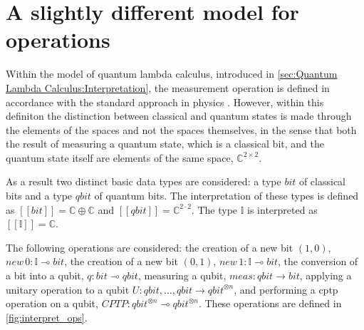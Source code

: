 \section{A slightly different model for operations}


Within the model of quantum lambda calculus, introduced in \autoref{sec:Quantum Lambda Calculus:Interpretation}, the measurement operation is defined in accordance with the standard approach in physics \cite{watrous2018theory}. However, within this definiton the distinction between classical and quantum states is made through the elements of the spaces and not the spaces themselves, in the sense that both the result of measuring a quantum state, which is a classical bit, and the quantum state itself are elements of the same space, $\mathbb{C}^{2 \times 2}$. 

As a result two distinct basic data types are considered: a type $\textit{bit}$ of classical bits and a type $\textit{qbit}$ of quantum bits.  The interpretation of these types is defined as  $[\![\textit{bit}]\!]=\mathbb{C}\oplus\mathbb{C}$ and $[\![\textit{qbit}]\!]=\mathbb{C}^{2\cdot 2}$. The type $\mathbb{I}$ is interpreted as $[\![\mathbb{I}]\!]=\mathbb{C}$.


The following operations are considered: the creation of a new bit $(1,0)$, $\textit{new} \hspace{2pt} 0  :\mathbb{I}  \multimap \textit{bit} $, the creation of a new bit $(0,1)$, $\textit{new} \hspace{2pt} 1  :\mathbb{I}  \multimap \textit{bit} $, the conversion of a bit into a qubit, $q : \textit{bit}  \multimap \textit{qbit}$, measuring a qubit, $\textit{meas}:\textit{qbit} \xrightarrow{} \textit{bit}$, applying a unitary operation to a qubit $\textit{U}:\textit{qbit},\ldots,\textit{qbit} \xrightarrow{} \textit{qbit}^{\otimes n}$, and performing a \acrshort{cptp} operation on a qubit, $\textit{CPTP}: \textit{qbit}^{\otimes n} \multimap \textit{qbit}^{\otimes n}$. These operations are defined in \autoref{fig:interpret_ops}. 

